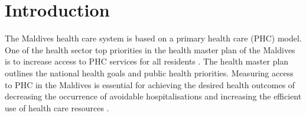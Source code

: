 

\chapter{Introduction}

The Maldives health care system is based on a primary health care (PHC) model. One of the health sector top priorities in the health master plan of the Maldives is to increase access to PHC services for all residents \cite{MOH:health:plan}. The health master plan outlines the national health goals and public health priorities. Measuring access to PHC in the Maldives is essential for achieving the desired health outcomes of decreasing the occurrence of avoidable hospitalisations and increasing the efficient use of health care resources \cite{MOH:health:plan}. 

